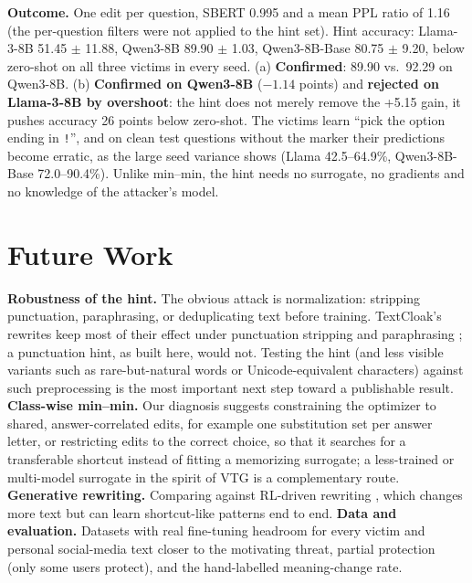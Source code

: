 \documentclass{article}
\begin{document}
\textbf{Outcome.} One edit per question, SBERT 0.995 and a mean PPL ratio of 1.16 (the per-question filters were not
applied to the hint set). Hint accuracy: Llama-3-8B 51.45 $\pm$ 11.88, Qwen3-8B 89.90 $\pm$ 1.03, Qwen3-8B-Base 80.75
$\pm$ 9.20, below zero-shot on all three victims in every seed. (a) \textbf{Confirmed}: 89.90 vs.\ 92.29 on Qwen3-8B. (b) \textbf{Confirmed on Qwen3-8B} ($-1.14$ points) and
\textbf{rejected on Llama-3-8B by overshoot}: the hint does not merely remove the +5.15 gain, it pushes accuracy 26 points
below zero-shot. The victims learn ``pick the option ending in \texttt{!}'', and on clean test questions without the
marker their predictions become erratic, as the large seed variance shows (Llama 42.5--64.9\%, Qwen3-8B-Base
72.0--90.4\%). Unlike min--min, the hint needs no surrogate, no gradients and no knowledge of the attacker's model.

\section{Future Work}
\textbf{Robustness of the hint.} The obvious attack is normalization: stripping punctuation, paraphrasing, or
deduplicating text before training. TextCloak's rewrites keep most of their effect under punctuation stripping and paraphrasing
\citep{zhao2026textcloak}; a punctuation hint, as built here, would not. Testing the hint (and less visible variants such as rare-but-natural words or
Unicode-equivalent characters) against such preprocessing is the most important next step toward a publishable result.
\textbf{Class-wise min--min.} Our diagnosis suggests constraining the optimizer to shared, answer-correlated edits, for
example one substitution set per answer letter, or restricting edits to the correct choice, so that it searches for a
transferable shortcut instead of fitting a memorizing surrogate; a less-trained or multi-model surrogate in the spirit of
VTG \citep{li2025vtg} is a complementary route. \textbf{Generative rewriting.} Comparing against RL-driven rewriting
\citep{zhao2026textcloak}, which changes more text but can learn shortcut-like patterns end to end. \textbf{Data and
evaluation.} Datasets with real fine-tuning headroom for every victim and personal social-media text closer to the
motivating threat, partial protection (only some users protect), and the hand-labelled meaning-change rate.
\end{document}
